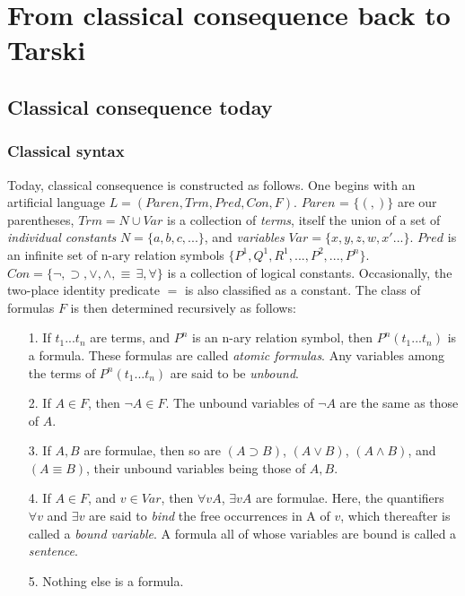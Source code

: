 \documentclass[]{article}
\begin{document}
\section{From classical consequence back to Tarski}
\subsection{Classical consequence today}
\subsubsection{Classical syntax}
Today, classical consequence is constructed as follows. One begins with an artificial language $L = (Paren, Trm, Pred, Con, F)$. $Paren$ = $\{(, )\}$ are our parentheses, $Trm = N \cup Var$ is a collection of \textit{terms}, itself the union of a set of \textit{individual constants} $N = \{a, b, c, ...\}$, and \textit{variables} $Var = \{x, y, z, w, x'...\}$. $Pred$ is an infinite set of n-ary relation symbols $\{P^{1}, Q^{1}, R^{1},..., P^{2},..., P^{n}\}$. $Con = \{\neg, \supset, \vee, \wedge, \equiv\, \exists, \forall\}$ is a collection of logical constants. Occasionally, the two-place identity predicate $=$ is also classified as a constant. The class of formulas $F$ is then determined recursively as follows:
\begin{itemize}
	\item[1.] If $t_{1} ... t_{n}$ are terms, and $P^{n}$ is an n-ary relation symbol, then $P^{n}(t_{1} ... t_{n})$ is a formula. These formulas are called \textit{atomic formulas}. Any variables among the terms of $P^{n}(t_{1} ... t_{n})$ are said to be \textit{unbound}.
	\item[2.] If $A \in F$, then $\neg A \in F$. The unbound variables of $\neg A$ are the same as those of $A$.
	\item[3.] If $A, B$ are formulae, then so are $(A \supset B)$, $(A \vee B)$, $(A \wedge B)$, and $(A \equiv B)$, their unbound variables being those of $A, B$.
	\item[4.] If $A \in F$, and $v \in Var$, then $\forall v A$, $\exists v A$ are formulae. Here, the quantifiers $\forall v$ and $\exists v$ are said to \textit{bind} the free occurrences in A of $v$, which thereafter is called a \textit{bound variable}. A formula all of whose variables are bound is called a \textit{sentence}.
	\item[5.] Nothing else is a formula.
\end{itemize}
\end{document}
